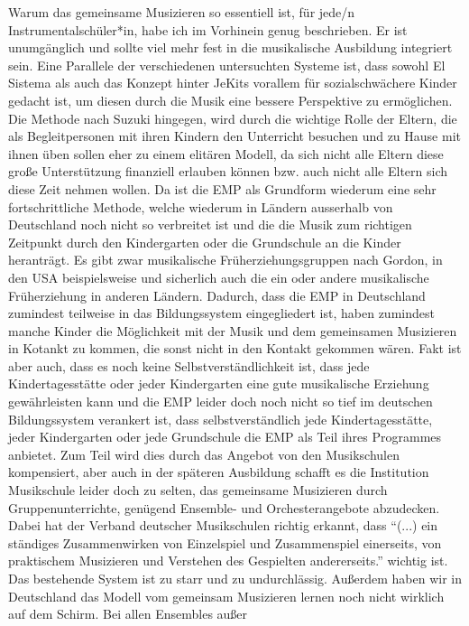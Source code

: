 Warum das gemeinsame Musizieren so essentiell ist, für jede/n
Instrumentalschüler*in, habe ich im Vorhinein genug beschrieben. Er ist
unumgänglich und sollte viel mehr fest in die musikalische Ausbildung integriert
sein. Eine Parallele der verschiedenen untersuchten Systeme ist, dass sowohl El
Sistema als auch das Konzept hinter JeKits vorallem für sozialschwächere Kinder
gedacht ist, um diesen durch die Musik eine bessere Perspektive zu ermöglichen.
Die Methode nach Suzuki hingegen, wird durch die wichtige Rolle der Eltern, die
als Begleitpersonen mit ihren Kindern den Unterricht besuchen und zu Hause mit
ihnen üben sollen eher zu einem elitären Modell, da sich nicht alle Eltern diese
große Unterstützung finanziell erlauben können bzw. auch nicht alle Eltern sich
diese Zeit nehmen wollen. Da ist die EMP als Grundform wiederum eine sehr
fortschrittliche Methode, welche wiederum in Ländern ausserhalb von Deutschland
noch nicht so verbreitet ist und die die Musik zum richtigen Zeitpunkt durch den
Kindergarten oder die Grundschule an die Kinder heranträgt. Es gibt zwar
musikalische Früherziehungsgruppen nach Gordon, in den USA beispielsweise und
sicherlich auch die ein oder andere musikalische Früherziehung in anderen
Ländern. Dadurch, dass die EMP in Deutschland zumindest teilweise in das
Bildungssystem eingegliedert ist, haben zumindest manche Kinder die Möglichkeit
mit der Musik und dem gemeinsamen Musizieren in Kotankt zu kommen, die sonst
nicht in den Kontakt gekommen wären. Fakt ist aber auch, dass es noch keine
Selbstverständlichkeit ist, dass jede Kindertagesstätte oder jeder Kindergarten
eine gute musikalische Erziehung gewährleisten kann und die EMP leider doch noch
nicht so tief im deutschen Bildungssystem verankert ist, dass selbstverständlich
jede Kindertagesstätte, jeder Kindergarten oder jede Grundschule die EMP als
Teil ihres Programmes anbietet. Zum Teil wird dies durch das Angebot von den
Musikschulen kompensiert, aber auch in der späteren Ausbildung schafft es die
Institution Musikschule leider doch zu selten, das gemeinsame Musizieren durch
Gruppenunterrichte, genügend Ensemble- und Orchesterangebote abzudecken. Dabei
hat der Verband deutscher Musikschulen richtig erkannt, dass \enquote{(...) ein
ständiges Zusammenwirken von Einzelspiel und Zusammenspiel einerseits, von
praktischem Musizieren und Verstehen des Gespielten andererseits.} wichtig ist.
\autocite[22]{losert:die_kunst_zu_unterrichten} Das bestehende System ist zu starr und zu
undurchlässig. Außerdem haben wir in Deutschland das Modell vom gemeinsam
Musizieren lernen noch nicht wirklich auf dem Schirm. Bei allen Ensembles außer
